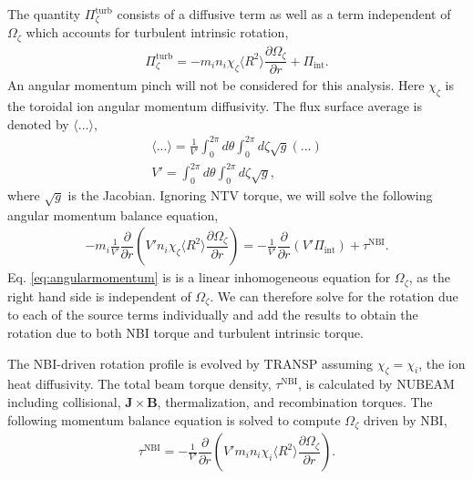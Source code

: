 \documentclass[aip, pop, preprint]{revtex4-1}
\numberwithin{figure}{section}
\numberwithin{equation}{section}
\newcommand{\partder}[2]{\dfrac{\partial  #1}{\partial  #2}} %
\begin{document}
The quantity $\Pi_{\zeta}^{\text{turb}}$ consists of a diffusive term as well as a term independent of $\Omega_{\zeta}$ which accounts for turbulent intrinsic rotation, 
\begin{gather}
\Pi_{\zeta}^{\text{turb}} = -m_i n_i \chi_{\zeta} \langle R^2 \rangle \partder{\Omega_{\zeta}}{r} + \Pi_{\text{int}}.
\end{gather}
An angular momentum pinch will not be considered for this analysis. Here $\chi_{\zeta}$ is the toroidal ion angular momentum diffusivity. The flux surface average is denoted by $\langle ... \rangle$,
\begin{gather}
\langle ... \rangle = \frac{1}{V'} \int_0^{2 \pi} d \theta \int_0^{2 \pi} d \zeta \sqrt{g} (...)
\\ V' = \int_0^{2\pi} d \theta \int_0^{2 \pi} d \zeta \sqrt{g},
\end{gather}
where $\sqrt{g}$ is the Jacobian.
Ignoring NTV torque, we will solve the following angular momentum balance equation,
\begin{gather}
-m_i \frac{1}{V'} \partder{}{r} \left( V' n_i \chi_{\zeta} \langle R^2 \rangle \partder{\Omega_{\zeta}}{r} \right) =  -\frac{1}{V'} \partder{}{r} \left( V' \Pi_{\text{int}} \right) + \tau^{\text{NBI}}.
\label{eq:angularmomentum}
\end{gather}
Eq. \ref{eq:angularmomentum} is is a linear inhomogeneous equation for $\Omega_{\zeta}$, as the right hand side is independent of $\Omega_{\zeta}$. We can therefore solve for the rotation due to each of the source terms individually and add the results to obtain the rotation due to both NBI torque and turbulent intrinsic torque. 

The NBI-driven rotation profile is evolved by TRANSP assuming $\chi_{\zeta} = \chi_{i}$, the ion heat diffusivity. The total beam torque density, $\tau^{\text{NBI}}$, is calculated by NUBEAM including collisional, $\bm{J} \times \bm{B}$, thermalization, and recombination torques. The following momentum balance equation is solved to compute $\Omega_{\zeta}$ driven by NBI,
\begin{gather}
\tau^{\text{NBI}} = -\frac{1}{V'} \partder{}{r} \left( V' m_i n_i \chi_{i} \langle R^2 \rangle \partder{\Omega_{\zeta}}{r} \right).
\end{gather} 
\end{document}
